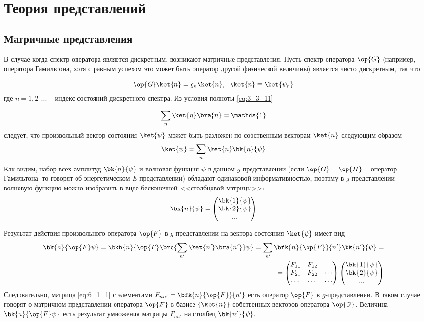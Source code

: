 \chapter{Теория представлений}

\section{Матричные представления}

В случае когда спектр оператора является дискретным, возникают матричные представления. Пусть спектр оператора $\op{G}$ (например, оператора Гамильтона, хотя с равным успехом это может быть оператор другой физической величины) является чисто дискретным, так что

$$
\op{G} \ket{n} = g_n \ket{n},~~ \ket{n} \equiv \ket{\psi_n}
$$%
%
где $n = 1, 2,...$ -- индекс состояний дискретного спектра. Из условия полноты \eqref{eq:3_3_11}

$$
\sum_n \ket{n}\bra{n} = \mathds{1}
$$%
%
следует, что произвольный вектор состояния $\ket{\psi}$ может быть разложен по собственным векторам $\ket{n}$ следующим образом
$$
\ket{\psi}=\sum_n \ket{n}\bk{n}{\psi}
$$%
%
Как видим, набор всех амплитуд $\bk{n}{\psi}$ и волновая функция $\psi$ в данном $g$-представлении (если $\op{G}=\op{H}$ -- оператор Гамильтона, то говорят об энергетическом $E$-представлении) обладают одинаковой информативностью, поэтому в $g$-представлении волновую функцию можно изобразить в виде бесконечной <<столбцовой матрицы>>:
$$
\bk{n}{\psi} = \begin{pmatrix}
\bk{1}{\psi}\\
\bk{2}{\psi}\\
...
\end{pmatrix}
$$

Результат действия произвольного оператора $\op{F}$ в $g$-представлении на вектора состояния $\ket{\psi}$ имеет вид
\begin{equation}
\begin{split}
\label{eq:6_1_1}
\bk{n}{\op{F}\psi} = \bkh{n}{\op{F}\brc{\sum_{n'} \ket{n'}\bra{n'}} \psi} = \sum_{n'} \bfk{n}{\op{F}}{n'}\bk{n'}{\psi} = \\ = \begin{pmatrix}
F_{11} & F_{12} & \cdots\\
F_{21} & F_{22} & \cdots\\
\cdots & \cdots & \cdots
\end{pmatrix} \begin{pmatrix}
\bk{1}{\psi}\\
\bk{2}{\psi}\\
...
\end{pmatrix}
\end{split}
\end{equation}%
%
Следовательно, матрица \eqref{eq:6_1_1} с элементами $F_{nn'} = \bfk{n}{\op{F}}{n'}$ есть оператор $\op{F}$ в $g$-представлении. В таком случае говорят о матричном представлении оператора $\op{F}$ в базисе $\{\ket{n}\}$ собственных векторов оператора $\op{G}$. Величина $\bk{n}{\op{F}\psi}$ есть результат умножения матрицы $F_{nn'}$ на столбец $\bk{n'}{\psi}$.

